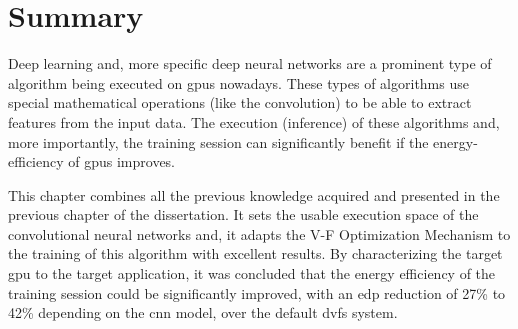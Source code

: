 \section{Summary}

Deep learning and, more specific deep neural networks are a prominent type of algorithm being executed on \acrshort{gpu}s nowadays. These types of algorithms use special mathematical operations (like the convolution) to be able to extract features from the input data. The execution (inference) of these algorithms and, more importantly, the training session can significantly benefit if the energy-efficiency of \acrshort{gpu}s improves.

This chapter combines all the previous knowledge acquired and presented in the previous chapter of the dissertation. It sets the usable execution space of the convolutional neural networks and, it adapts the V-F Optimization Mechanism to the training of this algorithm with excellent results. By characterizing the target \acrshort{gpu} to the target application, it was concluded that the energy efficiency of the training session could be significantly improved, with an \acrshort{edp} reduction of 27\% to 42\% depending on the \acrshort{cnn} model, over the default \acrshort{dvfs} system.
